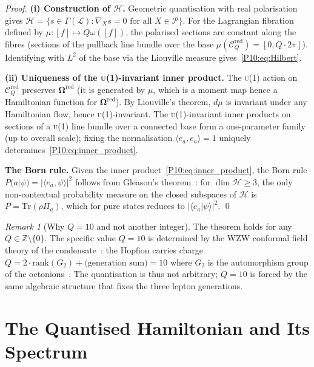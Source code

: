 \documentclass[11pt,a4paper]{article}
\theoremstyle{definition}
\theoremstyle{remark}
\newtheorem{remark}[theorem]{Remark}
\newcommand{\ZZ}{\mathbb{Z}}
\newcommand{\Hil}{\mathcal{H}}
\newcommand{\CQr}{\mathcal{C}_Q^{\mathrm{red}}}
\newcommand{\bOmega}{\boldsymbol{\Omega}}
\newcommand{\dmu}{d\mu}
\begin{document}
\begin{proof}
\textbf{(i) Construction of $\Hil$.}
Geometric quantisation with real polarisation gives
$\Hil = \{s\in\Gamma(\mathcal{L}) : \nabla_X s = 0\text{ for all }
X\in\mathcal{P}\}$.
For the Lagrangian fibration defined by $\mu:[f]\mapsto Q\omega([f])$,
the polarised sections are constant along the fibres
(sections of the pullback line bundle over the base $\mu(\CQr)=[0,Q\cdot2\pi]$).
Identifying with $L^2$ of the base via the Liouville measure gives~\eqref{P10:eq:Hilbert}.

\textbf{(ii) Uniqueness of the \textsc{u}(1)-invariant inner product.}
The \textsc{u}(1) action on $\CQr$ preserves $\bOmega^{\mathrm{red}}$
(it is generated by $\mu$, which is a moment map hence a Hamiltonian
function for $\bOmega^{\mathrm{red}}$).
By Liouville's theorem, $\dmu$ is invariant under any Hamiltonian
flow, hence \textsc{u}(1)-invariant.
The \textsc{u}(1)-invariant inner products on sections of a
\textsc{u}(1) line bundle over a connected base form a one-parameter
family (up to overall scale); fixing the normalisation
$\langle e_a,e_a\rangle = 1$ uniquely determines~\eqref{P10:eq:inner_product}.

\textbf{The Born rule.}
Given the inner product~\eqref{P10:eq:inner_product}, the Born rule
$P(a|\psi) = |\langle e_a,\psi\rangle|^2$ follows from
Gleason's theorem~\cite{Gleason1957}: for $\dim\Hil\geq3$,
the only non-contextual probability measure on the closed subspaces
of $\Hil$ is $P = \mathrm{Tr}(\rho\Pi_a)$, which for pure states
reduces to $|\langle e_a|\psi\rangle|^2$.
\qed
\end{proof}

\begin{remark}[Why $Q=10$ and not another integer]
\label{P10:rem:why_Q10}
The theorem holds for any $Q\in\ZZ\setminus\{0\}$.
The specific value $Q=10$ is determined by the WZW conformal
field theory of the condensate~\cite{Paper1}: the Hopfion carries
charge $Q = 2\cdot\text{rank}(G_2) + \text{(generation sum)} = 10$
where $G_2$ is the automorphism group of the octonions~\cite{Paper9}.
The quantisation is thus not arbitrary; $Q=10$ is forced by the
same algebraic structure that fixes the three lepton generations.
\end{remark}

\section{The Quantised Hamiltonian and Its Spectrum}
\label{P10:sec:spectrum}
\end{document}
